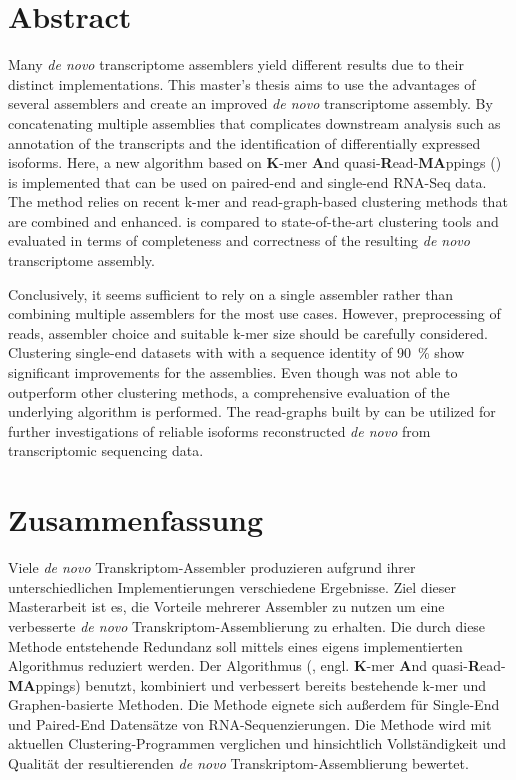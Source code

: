 \documentclass[12pt,a4paper,english]{article}
\begin{document}
\section*{Abstract}
	Many \textit{de novo} transcriptome assemblers yield different results due to their distinct implementations. This master's thesis aims to use the advantages of several assemblers and create an improved \textit{de novo} transcriptome assembly. By concatenating multiple assemblies that complicates downstream analysis such as annotation of the transcripts and the identification of differentially expressed isoforms. Here, a new algorithm based on \textbf{K}-mer \textbf{A}nd quasi-\textbf{R}ead-\textbf{MA}ppings (\karma) is implemented that can be used on paired-end and single-end RNA-Seq data. The method relies on recent k-mer and read-graph-based clustering methods that are combined and enhanced. \karma is compared to state-of-the-art clustering tools and evaluated in terms of completeness and correctness of the resulting \textit{de novo} transcriptome assembly.
	
	Conclusively, it seems sufficient to rely on a single assembler rather than combining multiple assemblers for the most use cases. However, preprocessing of reads, assembler choice and suitable k-mer size should be carefully considered. Clustering single-end datasets with \cdhit with a sequence identity of 90~\% show significant improvements for the assemblies.
	Even though \karma was not able to outperform other clustering methods, a comprehensive evaluation of the underlying algorithm is performed. The read-graphs built by \karma can be utilized for further investigations of reliable isoforms reconstructed \textit{de novo} from transcriptomic sequencing data.

\newpage
\section*{Zusammenfassung}
    Viele \textit{de novo} Transkriptom-Assembler produzieren aufgrund ihrer unterschiedlichen Implementierungen verschiedene Ergebnisse. Ziel dieser Masterarbeit ist es, die Vorteile mehrerer Assembler zu nutzen um eine verbesserte \textit{de novo} Transkriptom-Assemblierung zu erhalten. Die durch diese Methode entstehende Redundanz soll mittels eines eigens implementierten Algorithmus reduziert werden. Der Algorithmus (\karma, engl. \textbf{K}-mer \textbf{A}nd quasi-\textbf{R}ead-\textbf{MA}ppings) benutzt, kombiniert und verbessert bereits bestehende k-mer und Graphen-basierte Methoden.
    Die Methode eignete sich außerdem für Single-End und Paired-End Datensätze von RNA-Sequenzierungen.
    Die Methode wird mit aktuellen Clustering-Programmen verglichen und hinsichtlich Vollständigkeit und Qualität der resultierenden \textit{de novo} Transkriptom-Assemblierung bewertet.
    
\end{document}
